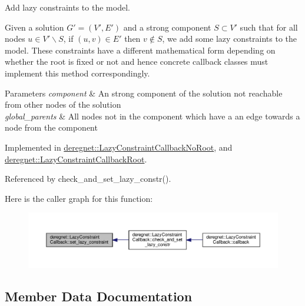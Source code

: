 Add lazy constraints to the model. 

Given a solution $G'=(V',E')$ and a strong component $S \subset V'$ such that for all nodes $u \in V' \backslash S $, if $(u,v) \in E'$ then $v \notin S$, we add some lazy constraints to the model. These constraints have a different mathematical form depending on whether the root is fixed or not and hence concrete callback classes must implement this method correspondingly.


\begin{DoxyParams}{Parameters}
{\em component} & An strong component of the solution not reachable from other nodes of the solution \\
\hline
{\em global\+\_\+parents} & All nodes not in the component which have a an edge towards a node from the component \\
\hline
\end{DoxyParams}


Implemented in \hyperlink{classderegnet_1_1LazyConstraintCallbackNoRoot_a3703cd9ca73c46d70bb90f50bb2e66e5}{deregnet\+::\+Lazy\+Constraint\+Callback\+No\+Root}, and \hyperlink{classderegnet_1_1LazyConstraintCallbackRoot_a8cfcc3df75b7a06a9885c7f6c5286344}{deregnet\+::\+Lazy\+Constraint\+Callback\+Root}.



Referenced by check\+\_\+and\+\_\+set\+\_\+lazy\+\_\+constr().

Here is the caller graph for this function\+:\nopagebreak
\begin{figure}[H]
\begin{center}
\leavevmode
\includegraphics[width=350pt]{classderegnet_1_1LazyConstraintCallback_a8f6db7da84271afcd2e2169318569558_icgraph}
\end{center}
\end{figure}


\subsection{Member Data Documentation}
\mbox{\label{classderegnet_1_1LazyConstraintCallback_a6a139307165523fa944e393e01aeec47}} 
